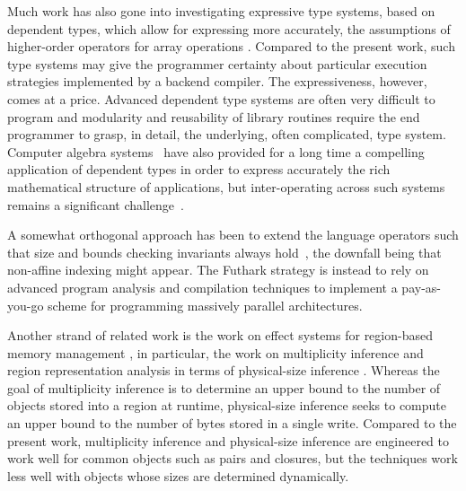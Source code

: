 Much work has also gone into investigating expressive type systems,
based on dependent types, which allow for expressing more accurately,
the assumptions of higher-order operators for array operations
\cite{AgdaAccellerate,Trojahner:2008,Trojahner2009643}. Compared to
the present work, such type systems may give the programmer certainty
about particular execution strategies implemented by a backend
compiler. The expressiveness, however, comes at a price. Advanced
dependent type systems are often very difficult to program and
modularity and reusability of library routines require the end
programmer to grasp, in detail, the underlying, often complicated,
type system.  Computer algebra systems~\cite{AXIOM,AldorCAH} have also
provided for a long time a compelling application of dependent types
in order to express accurately the rich mathematical structure of
applications, but inter-operating across such systems remains a
significant challenge~\cite{mapal_synasc,alma:ISSAC}.

A somewhat orthogonal approach has been to extend the language
operators such that size and bounds checking invariants always
hold~\cite{ElsmanDybdal:Array:2014}, the downfall being that
non-affine indexing might appear.  The Futhark strategy is instead to
rely on advanced program analysis and compilation techniques to
implement a pay-as-you-go scheme for programming massively parallel
architectures.

Another strand of related work is the work on effect systems for
region-based memory management \cite{mlkit_retrospective}, in
particular, the work on multiplicity inference and region
representation analysis in terms of physical-size inference
\cite{vejlstrup94,btv96}. Whereas the goal of multiplicity inference
is to determine an upper bound to the number of objects stored into a
region at runtime, physical-size inference seeks to compute an upper
bound to the number of bytes stored in a single write. Compared to the
present work, multiplicity inference and physical-size inference are
engineered to work well for common objects such as pairs and closures,
but the techniques work less well with objects whose sizes are
determined dynamically.

